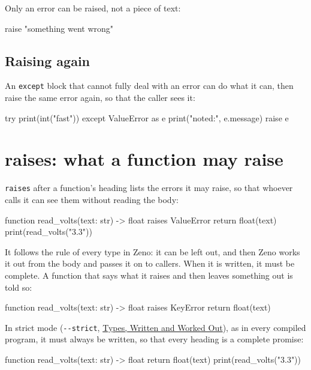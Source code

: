 Only an error can be raised, not a piece of text:

\begin{zeno}[fails=yes]
raise "something went wrong"
\end{zeno}

\subsection{Raising again}

An \verb|except| block that cannot fully deal with an error can do
what it can, then raise the same error again, so that the caller sees
it:

\begin{zeno}[fails=yes]
try {
    print(int("fast"))
} except ValueError as e {
    print("noted:", e.message)
    raise e
}
\end{zeno}

\section{raises: what a function may raise}

\verb|raises| after a function's heading lists the errors it may
raise, so that whoever calls it can see them without reading the body:

\begin{zeno}
function read_volts(text: str) -> float raises ValueError {
    return float(text)
}
print(read_volts("3.3"))
\end{zeno}

It follows the rule of every type in Zeno: it can be left out, and
then Zeno works it out from the body and passes it on to callers. When
it is written, it must be complete. A function that says what it
raises and then leaves something out is told so:

\begin{zeno}[fails=yes]
function read_volts(text: str) -> float raises KeyError {
    return float(text)
}
\end{zeno}

In strict mode (\verb|--strict|, \hyperref[ch-types]{Types, Written
and Worked Out}), as in every compiled program, it must always be
written, so that every heading is a complete promise:

\begin{zeno}[fails=yes, cmd=zeno check --strict {file}]
function read_volts(text: str) -> float {
    return float(text)
}
print(read_volts("3.3"))
\end{zeno}

